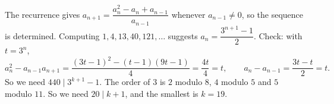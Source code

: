 The recurrence gives $a_{n+1}=\dfrac{a_n^2-a_n+a_{n-1}}{a_{n-1}}$ whenever $a_{n-1}\ne0$, so the sequence is determined. Computing $1,4,13,40,121,\dots$ suggests $a_n=\dfrac{3^{n+1}-1}2$. Check: with $t=3^n$,
\[a_n^2-a_{n-1}a_{n+1}=\dfrac{(3t-1)^2-(t-1)(9t-1)}4=\dfrac{4t}4=t,\qquad a_n-a_{n-1}=\dfrac{3t-t}2=t.\]
So we need $440\mid3^{k+1}-1$. The order of $3$ is $2$ modulo $8$, $4$ modulo $5$ and $5$ modulo $11$. So we need $20\mid k+1$, and the smallest is $k=\boxed{19}$.
